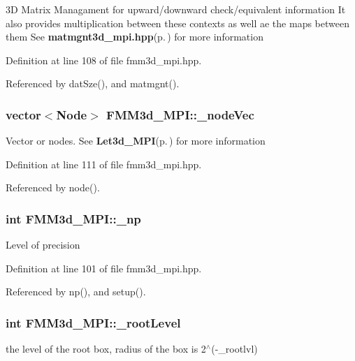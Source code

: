 3D Matrix Managament for upward/downward check/equivalent information It also provides multiplication between these contexts as well ae the maps between them See {\bf matmgnt3d\_\-mpi.hpp}{\rm (p.\,\pageref{matmgnt3d__mpi_8hpp})} for more information 

Definition at line 108 of file fmm3d\_\-mpi.hpp.

Referenced by dat\-Sze(), and matmgnt().
\subsubsection{\setlength{\rightskip}{0pt plus 5cm}vector$<${\bf Node}$>$ {\bf FMM3d\_\-MPI::\_\-node\-Vec}\hspace{0.3cm}{\tt  [protected]}}\label{classFMM3d__MPI_0dca3d8b42eecae5aeb38ed9545698e8_0dca3d8b42eecae5aeb38ed9545698e8}


Vector or nodes. See {\bf Let3d\_\-MPI}{\rm (p.\,\pageref{classLet3d__MPI})} for more information 

Definition at line 111 of file fmm3d\_\-mpi.hpp.

Referenced by node().
\subsubsection{\setlength{\rightskip}{0pt plus 5cm}int {\bf FMM3d\_\-MPI::\_\-np}\hspace{0.3cm}{\tt  [protected]}}\label{classFMM3d__MPI_3d05941198fa7da648bc68ddd5d0b5c1_3d05941198fa7da648bc68ddd5d0b5c1}


Level of precision 

Definition at line 101 of file fmm3d\_\-mpi.hpp.

Referenced by np(), and setup().
\subsubsection{\setlength{\rightskip}{0pt plus 5cm}int {\bf FMM3d\_\-MPI::\_\-root\-Level}\hspace{0.3cm}{\tt  [protected]}}\label{classFMM3d__MPI_01d82a06559beb8e8d5421992d7793ff_01d82a06559beb8e8d5421992d7793ff}


the level of the root box, radius of the box is 2$^\wedge$(-\_\-rootlvl) 

